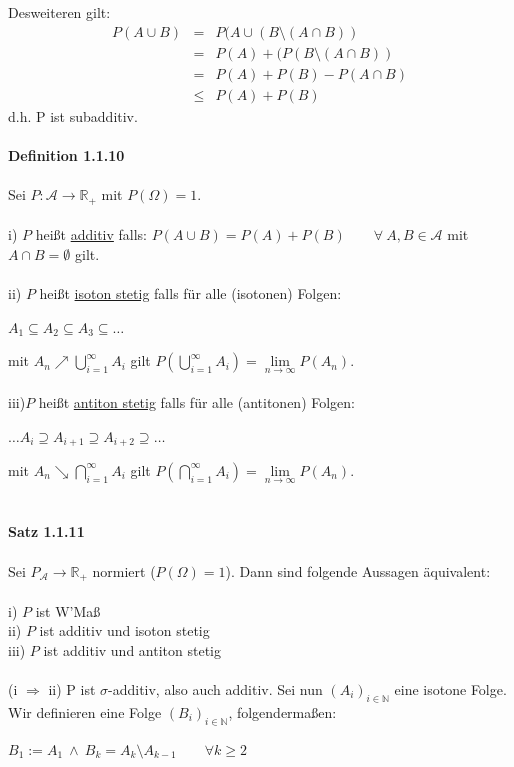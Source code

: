 \documentclass[10pt,a4paper]{report}
\numberwithin{equation}{section}
\numberwithin{figure}{section}
\theoremstyle{plain}
\theoremstyle{definition}
\theoremstyle{plain}
\theoremstyle{definition}
\theoremstyle{remark}
\theoremstyle{plain}
\theoremstyle{plain}
\theoremstyle{plain}
\newcommand{\1}{ \mathbb{1} } %
\begin{document}
Desweiteren gilt:
\begin{eqnarray*}
P(A\cup B)&=&P(A\cup(B\setminus (A\cap B))\\
&=&P(A)+(P(B\setminus(A \cap B))\\
&=& P(A)+P(B)-P(A\cap B)\\ 
&\leq& P(A)+P(B)
\end{eqnarray*}
d.h. P ist subadditiv.\\\\
\textbf{Definition 1.1.10}\\\\
Sei $P:\mathcal{A} \to \mathbb{R}_+$ mit $P(\Omega)=1$.\\\\
i) $P$ heißt \underline{additiv} falls: $P(A\cup B)=P(A)+P(B) \qquad \forall~ A,B\in\mathcal{A} $ mit $A\cap B =\emptyset$ gilt. \\\\
ii) $P$ heißt \underline{isoton stetig} falls für alle (isotonen) Folgen:
\begin{center}
$A_1 \subseteq A_2 \subseteq A_3 \subseteq \dots$
\end{center}
mit $A_n \nearrow \bigcup\limits_{i=1}^\infty A_i$ gilt $P\left(\bigcup\limits_{i=1}^\infty A_i\right)=\lim\limits_{n \to \infty}P(A_n)$.\\\\
iii)$P$ heißt \underline{antiton stetig} falls für alle (antitonen) Folgen:
\begin{center}
$\dots A_i \supseteq A_{i+1} \supseteq A_{i+2} \supseteq \dots$
\end{center}
mit $A_n \searrow \bigcap\limits_{i=1}^\infty A_i$ gilt $P\left(\bigcap\limits_{i=1}^\infty A_i\right)=\lim\limits_{n \to \infty}P(A_n)$.\\\\\\
\textbf{Satz 1.1.11}\\\\
Sei $P_\mathcal{A}\to \mathbb{R}_+$ normiert ($P(\Omega)=1$). Dann sind folgende Aussagen äquivalent:\\\\
i) $P$ ist W'Maß\\
ii) $P$ ist additiv und isoton stetig\\
iii) $P$ ist additiv und antiton stetig\\
\proof $ $\\
(i $\Rightarrow$ ii) P ist $\sigma$-additiv, also auch additiv. Sei nun $(A_i)_{i \in \mathbb{N}}$ eine isotone Folge. Wir definieren eine Folge $(B_i)_{i \in \mathbb{N}}$, folgendermaßen:\begin{center}
$B_1:=A_1 ~\wedge~ B_k=A_k\setminus A_{k-1} \qquad \forall k \geq 2 $
\end{center} 
\end{document}
